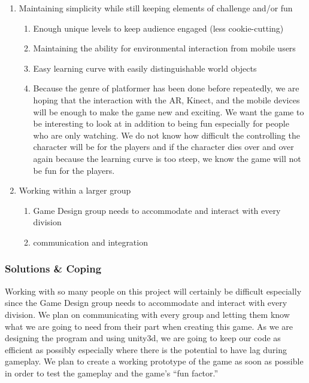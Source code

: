 \documentclass[10pt,letterpaper,oneside,english]{report}
\begin{document}
\begin{enumerate}
		\item Maintaining simplicity while still keeping elements of challenge and/or fun
		\begin{enumerate}
			\item Enough unique levels to keep audience engaged (less cookie-cutting)
			\item Maintaining the ability for environmental interaction from mobile users
			\item Easy learning curve with easily distinguishable world objects
			\item Because the genre of platformer has been done before repeatedly, we are hoping that the interaction with the AR, Kinect, and the mobile devices will be enough to make the game new and exciting. We want the game to be interesting to look at in addition to being fun especially for people who are only watching. We do not know how difficult the controlling the character will be for the players and if the character dies over and over again because the learning curve is too steep, we know the game will not be fun for the players.
		\end{enumerate}

		\item Working within a larger group
		\begin{enumerate}
			\item Game Design group needs to accommodate and interact with every division
			\item  communication and integration
		\end{enumerate}
	\end{enumerate}
	
		\subsubsection{Solutions \& Coping}
       	Working with so many people on this project will certainly be difficult especially since the Game Design group needs to accommodate and interact with every division. We plan on communicating with every group and letting them know what we are going to need from their part when creating this game. As we are designing the program and using \gls{unity3d}, we are going to keep our code as efficient as possibly especially where there is the potential to have lag during gameplay. We plan to create a working prototype of the game as soon as possible in order to test the gameplay and the game’s “fun factor.”



\printglossaries
\label{Glossary}
\end{document}
